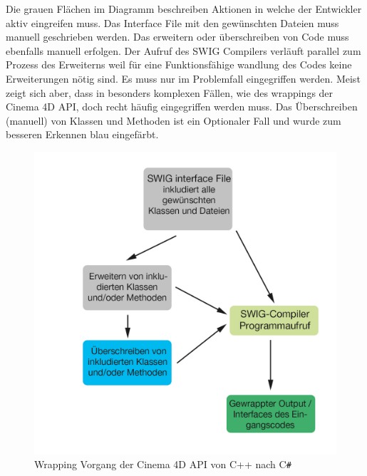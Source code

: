 \documentclass[pagesize, paper=a4, fontsize=12pt, titlepage=true, headings=small, headnosepline, abstractoff, liststotoc, nochapterprefix, plainheadsepline, twoside]{scrreprt}
\newcommand{\CS}{C\texttt{\#}}
\begin{document}
Die grauen Flächen im Diagramm beschreiben Aktionen in welche der Entwickler aktiv eingreifen muss. Das Interface File mit den gewünschten Dateien muss manuell geschrieben werden. Das erweitern oder überschreiben von Code muss ebenfalls manuell erfolgen. Der Aufruf des SWIG Compilers verläuft parallel zum Prozess des Erweiterns weil für eine Funktionsfähige wandlung des Codes keine Erweiterungen nötig sind. Es muss nur im Problemfall eingegriffen werden. Meist zeigt sich aber, dass in besonders komplexen Fällen, wie des wrappings der Cinema 4D API, doch recht häufig eingegriffen werden muss. Das Überschreiben (manuell) von Klassen und Methoden ist ein Optionaler Fall und wurde zum besseren Erkennen blau eingefärbt.
\begin{figure}[ht]
	\centering
	\includegraphics[width=\linewidth]{Bilder/swig_wrapping_csharp.jpg}
	\caption{Wrapping Vorgang der Cinema 4D API von C++ nach \CS}
	\label{SWIG wrapping Vorgang}
\end{figure}
\end{document}
